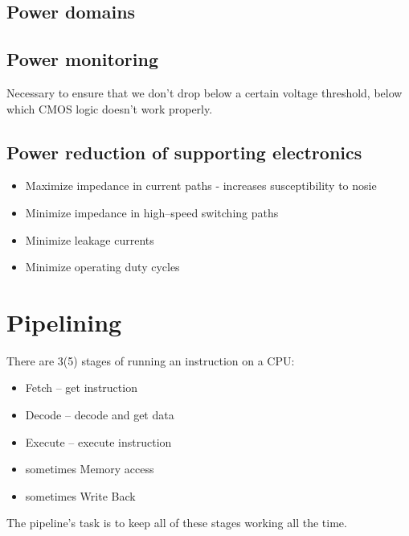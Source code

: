 \section{Power domains}
\section{Power monitoring}
Necessary to ensure that we don't drop below a certain voltage threshold, below which CMOS logic doesn't work properly. 
\section{Power reduction of supporting electronics}
\begin{itemize}
        \item Maximize impedance in current paths - increases susceptibility to nosie
        \item Minimize impedance in high--speed switching paths 
        \item Minimize leakage currents
        \item Minimize operating duty cycles
        
\end{itemize}



\chapter{Pipelining}
There are 3(5) stages of running an instruction on a CPU:
\begin{itemize}
        \item Fetch -- get instruction
        \item Decode -- decode and get data
        \item Execute -- execute instruction
        \item sometimes Memory access
        \item sometimes Write Back
\end{itemize}

The pipeline's task is to keep all of these stages working all the time.



